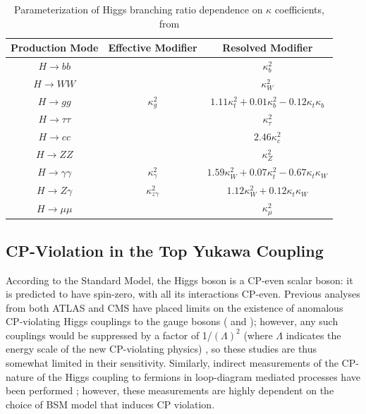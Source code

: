 \begin{table}[h]
    \centering
    \begin{tabular}{ccc}
	Production Mode & Effective Modifier & Resolved Modifier \\ \hline
	$H \rightarrow bb$ & & $\kappa_{b}^2$ \\
	$H \rightarrow WW$ & & $\kappa_{W}^{2}$ \\
	$H \rightarrow gg$ & $\kappa_{g}^{2}$ & $1.11 \kappa_{t}^{2} + 0.01 \kappa_{b}^2 - 0.12 \kappa_{t} \kappa_{b}$ \\
	$H \rightarrow \tau \tau$ & & $\kappa_{\tau}^{2}$ \\
	$H \rightarrow cc$ && $2.46 \kappa_{c}^{2}$ \\
	$H \rightarrow ZZ$ && $\kappa_{Z}^{2}$ \\
	$H \rightarrow \gamma \gamma$ & $\kappa_{\gamma}^{2}$ & $1.59 \kappa_{W}^{2} + 0.07 \kappa_{t}^2 - 0.67 \kappa_{t} \kappa_{W}$ \\
	$H \rightarrow Z \gamma$ & $\kappa_{z \gamma}^{2}$ & $1.12 \kappa_{W}^{2} + 0.12 \kappa_{t} \kappa_{W}$ \\
	$H \rightarrow \mu \mu$ && $\kappa_{\mu}^{2}$ \\
    \end{tabular}
    \caption{Parameterization of Higgs branching ratio dependence on $\kappa$ coefficients, from \cite{PhysRevD.101.012002}}
    \label{BRskappa}
\end{table}

\subsection{CP-Violation in the Top Yukawa Coupling} \label{sec:CP-yukawa}

According to the Standard Model, the Higgs boson is a CP-even scalar boson: it is predicted to have spin-zero, with all its interactions CP-even. Previous analyses from both ATLAS and CMS have placed limits on the existence of anomalous CP-violating Higgs couplings to the gauge bosons (\cite{Aad_2016} \cite{Khachatryan_2016} and \cite{Sirunyan_2019}); however, any such couplings would be suppressed by a factor of 1/$(\Lambda)^2$ (where $\Lambda$ indicates the energy scale of the new CP-violating physics) \cite{Zhang_2011}, so these studies are thus somewhat limited in their sensitivity. Similarly, indirect measurements of the CP-nature of the Higgs coupling to fermions in loop-diagram mediated processes have been performed \cite{Ellis} \cite{Brod_2013}; however, these measurements are highly dependent on the choice of BSM model that induces CP violation.

